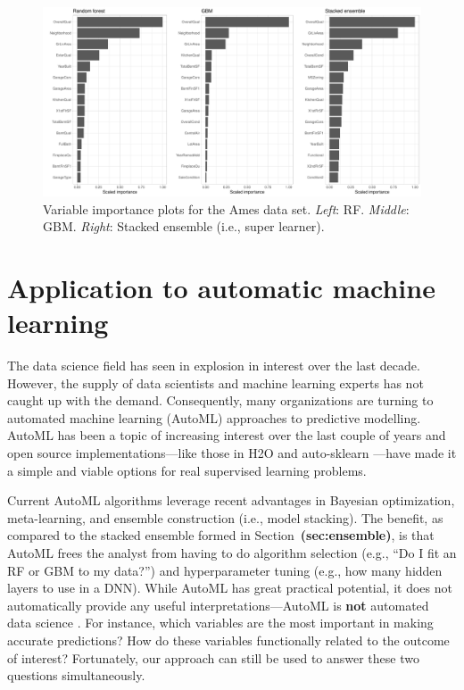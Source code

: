 \documentclass[12pt]{article}
\def\ref#1{\textbf{(#1)}}
\begin{document}
\begin{figure}[!htb]
  \centering
  \includegraphics[width=1.0\textwidth]{ames-ensemble-vip}
  \caption{Variable importance plots for the Ames data set. \textit{Left}: RF. \textit{Middle}: GBM. \textit{Right}: Stacked ensemble (i.e., super learner). \label{fig:ames-ensemble-vip}}
\end{figure}


\section{Application to automatic machine learning}
\label{sec:automl}

The data science field has seen in explosion in interest over the last decade. However, the supply of data scientists and machine learning experts has not caught up with the demand. Consequently, many organizations are turning to automated machine learning (AutoML) approaches to predictive modelling. AutoML has been a topic of increasing interest over the last couple of years and open source implementations---like those in H2O and auto-sklearn \citep{auto-sklearn}---have made it a simple and viable options for real supervised learning problems.

Current AutoML algorithms leverage recent advantages in Bayesian optimization, meta-learning, and ensemble construction (i.e., model stacking). The benefit, as compared to the stacked ensemble formed in Section~\ref{sec:ensemble}, is that AutoML frees the analyst from having to do algorithm selection (e.g., ``Do I fit an RF or GBM to my data?'') and hyperparameter tuning (e.g., how many hidden layers to use in a DNN). While AutoML has great practical potential, it does not automatically provide any useful interpretations---AutoML is \textbf{not} automated data science \citep{mayo_2017}. For instance, which variables are the most important in making accurate predictions? How do these variables functionally related to the outcome of interest? Fortunately, our approach can still be used to answer these two questions simultaneously.
\end{document}
